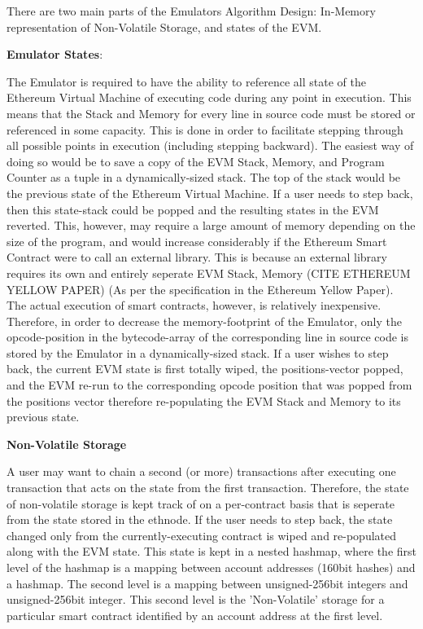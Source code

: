 \documentclass{report}
\begin{document}
        There are two main parts of the Emulators Algorithm Design: In-Memory representation of Non-Volatile Storage, and states of the EVM.
        \newpage

    \vspace{0.5cm}

    \textbf{Emulator States}:

    \vspace{0.5cm}

        The Emulator is required to have the ability to reference all state of the Ethereum Virtual Machine of executing code during any point in execution. This means that the Stack and Memory for every line in source code must be stored or referenced in some capacity. This is done in order to facilitate stepping through all possible points in execution (including stepping backward). The easiest way of doing so would be to save a copy of the EVM Stack, Memory, and Program Counter as a tuple in a dynamically-sized stack. The top of the stack would be the previous state of the Ethereum Virtual Machine. If a user needs to step back, then this state-stack could be popped and the resulting states in the EVM reverted. This, however, may require a large amount of memory depending on the size of the program, and would increase considerably if the Ethereum Smart Contract were to call an external library. This is because an external library requires its own and entirely seperate EVM Stack, Memory (CITE ETHEREUM YELLOW PAPER) (As per the specification in the Ethereum Yellow Paper). The actual execution of smart contracts, however, is relatively inexpensive. Therefore, in order to decrease the memory-footprint of the Emulator, only the opcode-position in the bytecode-array of the corresponding line in source code is stored by the Emulator in a dynamically-sized stack. If a user wishes to step back, the current EVM state is first totally wiped, the positions-vector popped, and the EVM re-run to the corresponding opcode position that was popped from the positions vector therefore re-populating the EVM Stack and Memory to its previous state.

        \vspace{0.5cm}

        \textbf{Non-Volatile Storage}

        \vspace{0.5cm}

            A user may want to chain a second (or more) transactions after executing one transaction that acts on the state from the first transaction. Therefore, the state of non-volatile storage is kept track of on a per-contract basis that is seperate from the state stored in the \Gls{ethnode}. If the user needs to step back, the state changed only from the currently-executing contract is wiped and re-populated along with the EVM state. This state is kept in a nested hashmap, where the first level of the hashmap is a mapping between account addresses (160bit hashes) and a hashmap. The second level is a mapping between unsigned-256bit integers and unsigned-256bit integer. This second level is the 'Non-Volatile' storage for a particular smart contract identified by an account address at the first level.
\end{document}
